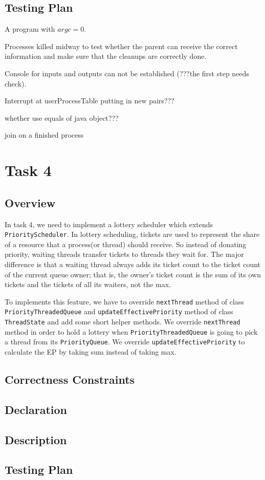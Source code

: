 \documentclass{article}
\begin{document}
\begin{spacing}{1.1}
\subsection{Testing Plan}
\begin{asparaitem}
  \item A program with $argc=0$.
  \item Processes killed midway to test whether the parent can receive the correct information and make sure that the cleanups are correctly done.
  \item Console for inputs and outputs can not be established (???the first step needs check).
  \item Interrupt at userProcessTable putting in new pairs???
  \item whether use equals of java object???
  \item join on a finished process
\end{asparaitem}


\section{Task 4}

\subsection{Overview}
In task 4, we need to implement a lottery scheduler which extends \texttt{PriorityScheduler}. In lottery scheduling, tickets are used to represent the share of a resource that a process(or thread) should receive. So instead of donating priority, waiting threads transfer tickets to threads they wait for. The major difference is that a waiting thread always adds its ticket count to the ticket count of the current queue owner; that is, the owner's ticket count is the sum of its own tickets and the tickets of all its waiters, not the max.

To implements this feature, we have to override \texttt{nextThread} method of class \texttt{PriorityThreadedQueue} and \texttt{updateEffectivePriority} method of class \texttt{ThreadState} and add some short helper methods. We override \texttt{nextThread} method in order to hold a lottery when \texttt{PriorityThreadedQueue} is going to pick a thread from its \texttt{PriorityQueue}. We override \texttt{updateEffectivePriority} to calculate the EP by taking sum instead of taking max.

\subsection{Correctness Constraints}

\subsection{Declaration}

\subsection{Description}

\subsection{Testing Plan}


\end{spacing}
\end{document}
